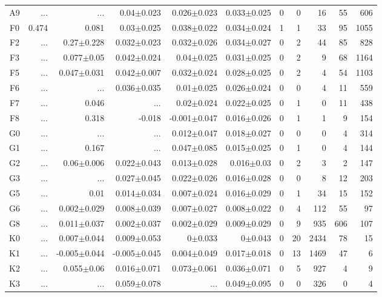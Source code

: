 \begin{table}[t]
\begin{table}[t]
\begin{center}
\begin{tabular}{c|rrrrr|rrrrr}
    A9	&	 ...	&	 ...	&	0.04$\pm$0.023	&	0.026$\pm$0.023	&	0.033$\pm$0.025	&	0	&	0	&	16	&	55	&	606	\\
    F0	&	0.474	&	0.081	&	0.03$\pm$0.025	&	0.038$\pm$0.022	&	0.034$\pm$0.024	&	1	&	1	&	33	&	95	&	1055	\\
    F2	&	 ...	&	0.27$\pm$0.228	&	0.032$\pm$0.023	&	0.032$\pm$0.026	&	0.034$\pm$0.027	&	0	&	2	&	44	&	85	&	828	\\
    F3	&	 ...	&	0.077$\pm$0.05	&	0.042$\pm$0.024	&	0.04$\pm$0.025	&	0.031$\pm$0.025	&	0	&	2	&	9	&	68	&	1164	\\
    F5	&	 ...	&	0.047$\pm$0.031	&	0.042$\pm$0.007	&	0.032$\pm$0.024	&	0.028$\pm$0.025	&	0	&	2	&	4	&	54	&	1103	\\
    F6	&	 ...	&	 ...	&	0.036$\pm$0.035	&	0.01$\pm$0.025	&	0.026$\pm$0.024	&	0	&	0	&	4	&	11	&	559	\\
    F7	&	 ...	&	0.046	&	 ...	&	0.02$\pm$0.024	&	0.022$\pm$0.025	&	0	&	1	&	0	&	11	&	438	\\
    F8	&	 ...	&	0.318	&	-0.018	&	-0.001$\pm$0.047	&	0.016$\pm$0.026	&	0	&	1	&	1	&	9	&	154	\\
    G0	&	 ...	&	 ...	&	 ...	&	0.012$\pm$0.047	&	0.018$\pm$0.027	&	0	&	0	&	0	&	4	&	314	\\
    G1	&	 ...	&	0.167	&	 ...	&	0.047$\pm$0.085	&	0.015$\pm$0.025	&	0	&	1	&	0	&	4	&	144	\\
    G2	&	 ...	&	0.06$\pm$0.006	&	0.022$\pm$0.043	&	0.013$\pm$0.028	&	0.016$\pm$0.03	&	0	&	2	&	3	&	2	&	147	\\
    G3	&	 ...	&	 ...	&	0.027$\pm$0.045	&	0.022$\pm$0.026	&	0.016$\pm$0.028	&	0	&	0	&	8	&	12	&	203	\\
    G5	&	 ...	&	0.01	&	0.014$\pm$0.034	&	0.007$\pm$0.024	&	0.016$\pm$0.029	&	0	&	1	&	34	&	15	&	152	\\
    G6	&	 ...	&	0.002$\pm$0.029	&	0.008$\pm$0.039	&	0.007$\pm$0.027	&	0.008$\pm$0.022	&	0	&	4	&	112	&	55	&	97	\\
    G8	&	 ...	&	0.011$\pm$0.037	&	0.002$\pm$0.037	&	0.002$\pm$0.029	&	0.009$\pm$0.029	&	0	&	9	&	935	&	606	&	107	\\
    K0	&	 ...	&	0.007$\pm$0.044	&	0.009$\pm$0.053	&	0$\pm$0.033	&	0$\pm$0.043	&	0	&	20	&	2434	&	78	&	15	\\
    K1	&	 ...	&	-0.005$\pm$0.044	&	-0.005$\pm$0.045	&	0.004$\pm$0.049	&	0.017$\pm$0.018	&	0	&	13	&	1469	&	47	&	6	\\
    K2	&	 ...	&	0.055$\pm$0.06	&	0.016$\pm$0.071	&	0.073$\pm$0.061	&	0.036$\pm$0.071	&	0	&	5	&	927	&	4	&	9	\\
    K3	&	 ...	&	 ...	&	0.059$\pm$0.078	&	 ...	&	0.049$\pm$0.095	&	0	&	0	&	326	&	0	&	4	\\

\end{tabular}
\end{center}
\end{table}
\end{table}
